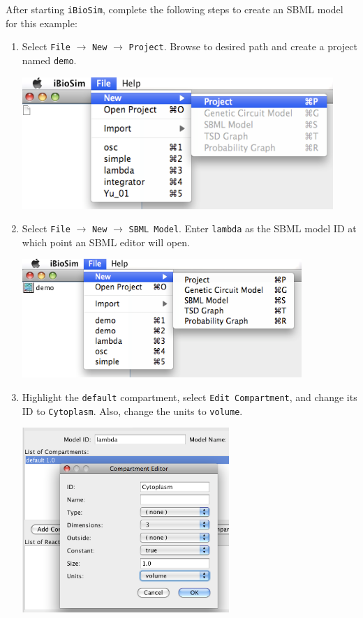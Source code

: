 \documentclass[titlepage,11pt]{article}
\begin{document}
\noindent
After starting {\tt iBioSim}, complete the following steps to create
an SBML model for this example:
\begin{enumerate}
\item Select {\tt File} $\rightarrow$ {\tt New} $\rightarrow$ {\tt Project}.
      Browse to desired path and create a project named {\tt demo}.

\includegraphics[height=50mm]{screenshots/project}

\item Select {\tt File} $\rightarrow$ {\tt New} $\rightarrow$ {\tt SBML Model}.
      Enter {\tt lambda} as the SBML model ID at which point an SBML
      editor will open.

\includegraphics[height=45mm]{screenshots/newModel}

\clearpage

\item Highlight the {\tt default} compartment, select {\tt Edit
    Compartment}, and change its ID to {\tt Cytoplasm}.  Also, change 
    the units to {\tt volume}.

\includegraphics[height=70mm]{screenshots/compartment}


\end{enumerate}
\end{document}
